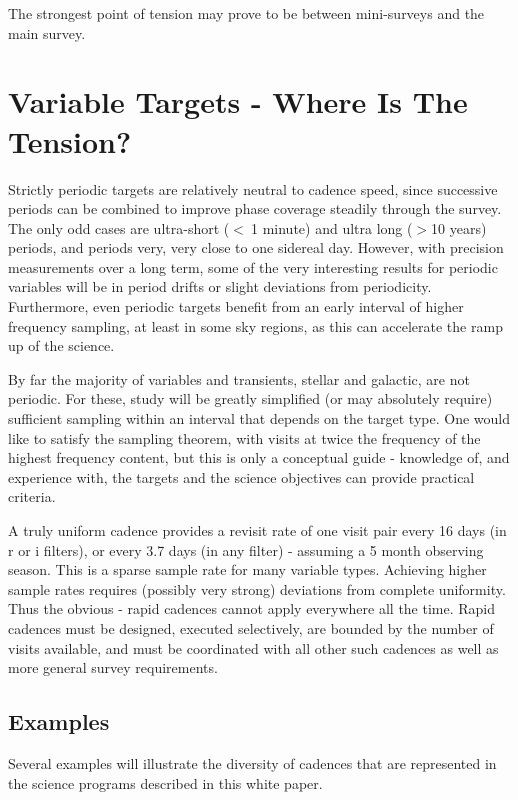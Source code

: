 The strongest point of tension may prove to be between mini-surveys and the main survey.

\section{Variable Targets - Where Is The Tension?}

Strictly periodic targets are relatively neutral to cadence speed, since successive periods can be combined to improve phase coverage steadily through the survey.  The only odd cases are ultra-short ($<~ $1 minute) and ultra long ($> $10 years) periods, and periods very, very close to one sidereal day.  However, with precision measurements over a long term, some of the very interesting results for periodic variables will be in period drifts or slight deviations from periodicity. Furthermore, even periodic targets benefit from an early interval of higher frequency sampling, at least in some sky regions, as this can accelerate the ramp up of the science.

By far the majority of variables and transients, stellar and galactic, are not periodic. For these, study will be greatly simplified (or may absolutely require) sufficient sampling within an interval that depends on the target type. One would like to satisfy the sampling theorem, with visits at twice the frequency of the highest frequency content, but this is only a conceptual guide - knowledge of, and experience with, the targets and the science objectives can provide practical criteria.

A truly uniform cadence provides a revisit rate of one visit pair every 16 days (in r or i filters), or every 3.7 days (in any filter) - assuming a 5 month observing season.  This is a sparse sample rate for many variable types.  Achieving higher sample rates requires (possibly very strong) deviations from complete uniformity.  Thus the obvious -  rapid cadences cannot apply everywhere all the time. Rapid cadences must be designed, executed selectively, are bounded by the number of visits available, and must be coordinated with all other such cadences as well as more general survey requirements. 

\subsection{Examples}

Several examples will illustrate the diversity of cadences that are represented in the science programs described in this white paper.

